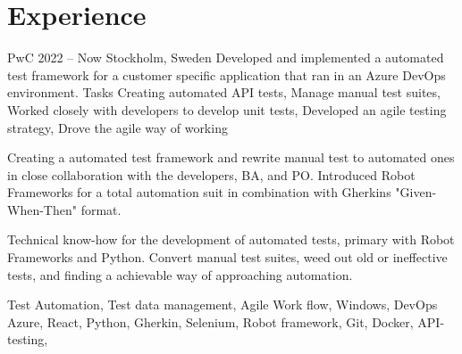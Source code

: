 \documentclass{sobCV}[2015/09/08]
\begin{document}
\section{Experience}
   {PwC}
   {2022 -- Now}
   {Stockholm, Sweden}{
       Developed and implemented a automated test framework for a customer
       specific application that ran in an Azure DevOps environment.
   }
   {Tasks}{
       Creating automated API tests, 
       Manage manual test suites,
       Worked closely with developers to develop unit tests,
       Developed an agile testing strategy,
       Drove the agile way of working 
 }{  %
      {

         Creating a automated test framework and rewrite manual test to
         automated ones in close collaboration with the developers, BA, and
         PO. Introduced Robot Frameworks for a total automation suit in
         combination with Gherkins "Given-When-Then" format. 

         Technical know-how for the development of automated tests, primary
         with Robot Frameworks and Python. Convert manual test suites, weed
         out old or ineffective tests, and finding a achievable way of
         approaching automation. 

     }
 }{
       Test Automation,
       Test data management,
       Agile Work flow, 
       Windows, 
       DevOps Azure, 
       React, 
       Python, 
       Gherkin, 
       Selenium, 
       Robot framework,
       Git, 
       Docker, 
       API-testing, 

}
\end{document}
